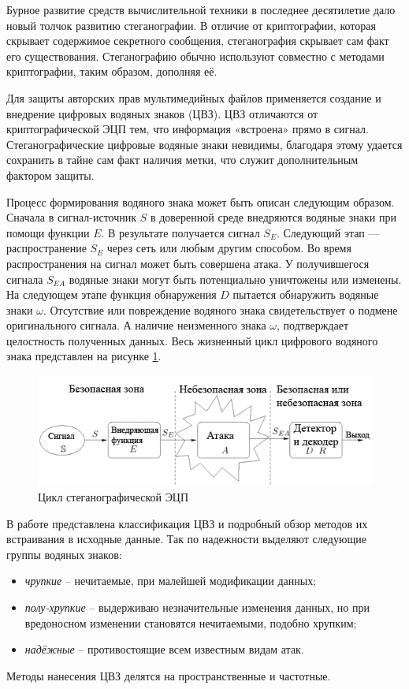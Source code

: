 \par Бурное развитие средств вычислительной техники в последнее десятилетие дало новый толчок развитию стеганографии. В отличие от криптографии, которая скрывает содержимое секретного сообщения, стеганография скрывает сам факт его существования. Стеганографию обычно используют совместно с методами криптографии, таким образом, дополняя её. 
\par Для защиты авторских прав мультимедийных файлов применяется создание и внедрение цифровых водяных знаков (ЦВЗ). ЦВЗ отличаются от криптографической ЭЦП тем, что информация «встроена» прямо в сигнал. Стеганографические цифровые водяные знаки невидимы, благодаря этому удается сохранить в тайне сам факт наличия метки, что служит дополнительным фактором защиты. 

\par Процесс формирования водяного знака может быть описан следующим образом. Сначала в сигнал-источник $S$ в доверенной среде внедряются водяные знаки при помощи функции $E$. В результате получается сигнал $S_E$. Следующий этап — распространение $S_E$ через сеть или любым другим способом. Во время распространения на сигнал может быть совершена атака. 
У получившегося сигнала $S_{EA}$ водяные знаки могут быть потенциально уничтожены или изменены. На следующем этапе функция обнаружения $D$ пытается обнаружить водяные знаки $\omega$. Отсутствие или повреждение водяного знака свидетельствует о подмене оригинального сигнала. А наличие неизменного знака $\omega$, подтверждает целостность полученных данных. Весь жизненный цикл цифрового водяного знака представлен на рисунке \ref{fig:DWMLifiCircle}.
\begin{figure}[h]
\centering
\includegraphics[width=0.9\linewidth]{./DWMLifiCircle}
\caption[Цикл стеганографической ЭЦП]{Цикл стеганографической ЭЦП \cite{lu2004}}
\label{fig:DWMLifiCircle}
\end{figure}

\par В работе \cite{gupta2015} представлена классификация ЦВЗ и подробный обзор методов их встраивания в исходные данные. Так по надежности выделяют следующие группы водяных знаков:
\begin{itemize}
\item \textit{чрупкие} -- нечитаемые, при малейшей модификации данных;
\item \textit{полу-хрупкие} -- выдерживаю незначительные изменения данных, но при вредоносном изменении становятся нечитаемыми, подобно хрупким;
\item \textit{надёжные}  -- противостоящие всем известным видам атак.
\end{itemize}
\par Методы нанесения ЦВЗ делятся на пространственные и частотные. 

